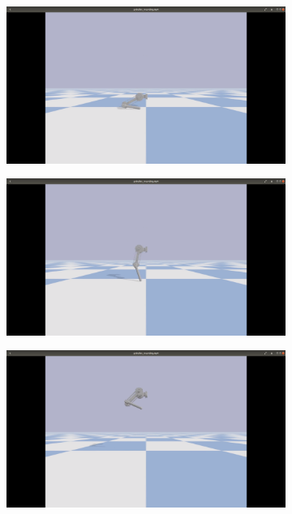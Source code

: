 \documentclass[onecolumn, letter paper]{report}
\begin{document}
\begin{figure}[htb!]
    \centering
    \begin{subfigure}{.24\textwidth}
    \includegraphics[width=\textwidth, trim={25cm 10cm 25cm 5cm}, clip]{figures/sim0.6m/s61.png}
    \end{subfigure}
    \begin{subfigure}{.24\textwidth}
    \includegraphics[width=\textwidth, trim={25cm 10cm 25cm 5cm}, clip]{figures/sim0.6m/s62.png}
    \end{subfigure}
    \begin{subfigure}{.24\textwidth}
    \includegraphics[width=\textwidth, trim={25cm 10cm 25cm 5cm}, clip]{figures/sim0.6m/s63.png}

\end{subfigure}
\end{figure}
\end{document}
